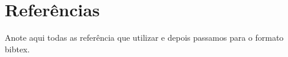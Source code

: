 \chapter{Referências}

Anote aqui todas as referência que utilizar e depois passamos para o formato bibtex.
